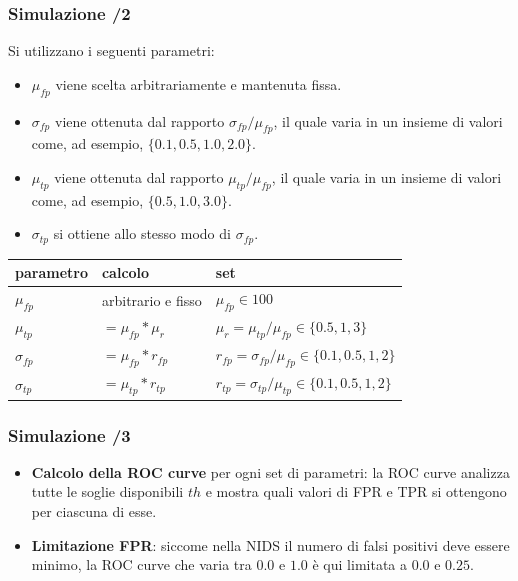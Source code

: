 \documentclass{beamer}
\begin{document}
\begin{frame}
    \frametitle{Simulazione /2}

    Si utilizzano i seguenti parametri:
    \begin{itemize}
        \item $\mu_{fp}$ viene scelta arbitrariamente e mantenuta fissa.
        \item $\sigma_{fp}$ viene ottenuta dal rapporto $\sigma_{fp}/\mu_{fp}$, il
        quale varia in un insieme di valori come, ad esempio, $\{0.1,
        0.5, 1.0, 2.0 \}$.
        \item $\mu_{tp}$ viene ottenuta dal rapporto $\mu_{tp}/\mu_{fp}$, il quale varia in un insieme di valori
        come, ad esempio, $\{0.5, 1.0, 3.0\}$.
        \item $\sigma_{tp}$ si ottiene allo stesso modo di $\sigma_{fp}$.
    \end{itemize}

    \begin{center}
        \begin{tabular}{l||l|l}
            parametro & calcolo & set \\\midrule
            $\mu_{fp}$ & arbitrario e fisso & $\mu_{fp} \in {100}$ \\
            $\mu_{tp}$ & $=\mu_{fp} * \mu_{r}$ & $\mu_{r}=\mu_{tp}/\mu_{fp} \in \{0.5, 1, 3 \}$ \\
            $\sigma_{fp}$ & $=\mu_{fp} * r_{fp}$ & $r_{fp}=\sigma_{fp}/\mu_{fp} \in \{0.1,
            0.5, 1, 2 \}$ \\
            $\sigma_{tp}$ & $=\mu_{tp} * r_{tp}$ & $r_{tp}=\sigma_{tp}/\mu_{tp} \in \{0.1,
            0.5, 1, 2 \}$ \\
        \end{tabular}
    \end{center}
\end{frame}

\begin{frame}
    \frametitle{Simulazione /3}

    \begin{itemize}
        \item \textbf{Calcolo della ROC curve} per ogni set di parametri: la ROC curve analizza tutte le soglie disponibili $th$ e mostra quali
        valori di FPR e TPR si ottengono per ciascuna di esse.
        \item \textbf{Limitazione FPR}: siccome nella NIDS il numero di falsi positivi deve essere minimo, la
        ROC curve che varia tra $0.0$ e $1.0$ è qui limitata a $0.0$ e $0.25$.
    \end{itemize}
\end{frame}
\end{document}

